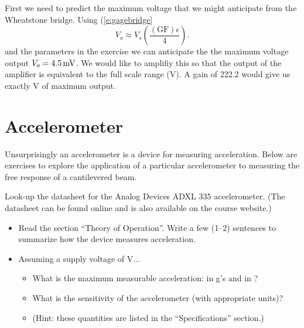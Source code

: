 \ifsolutions
\begin{soln}
First we need to predict the maximum voltage that we might anticipate from the Wheatstone bridge.  Using (\ref{e:gagebridge}
\[
V_o \approx V_s\left( \frac{(\mathrm{GF})\epsilon}{4} \right).
\]
and the parameters in the exercise we can anticipate the the maximum voltage output $V_o=\unit[4.5]{mV}$.  We would like to amplifiy this so that the output of the amplifier is equivalent to the full scale range (\unit[1]{V}).  A gain of 222.2 would give us exactly \unit[1]{V} of maximum output.
\end{soln}
\fi

\section{Accelerometer}
Unsurprisingly an accelerometer is a device for measuring acceleration.  Below are exercises to explore the application of a particular accelerometer to measuring the free response of a cantilevered beam.

\begin{ex}
Look-up the datasheet for the Analog Devices ADXL 335 accelerometer.  (The datasheet can be found online and is also available on the course website.)
\begin{itemize}
\item Read the section ``Theory of Operation''.  Write a few (1--2) sentences to summarize how the device measures acceleration.
\item Assuming a supply voltage of \unit[3]{V}...
  \begin{itemize}
  \item What is the maximum measurable acceleration: in g's and in ?
  \item What is the sensitivity of the accelerometer (with appropriate units)?
  \item (Hint: these quantities are listed in the ``Specifications'' section.)
  \end{itemize}
\end{itemize}
\end{ex}

\ifsolutions
\begin{soln}

\end{soln}
\fi



